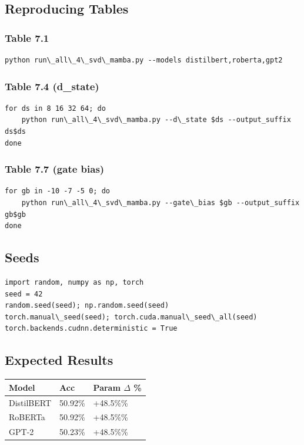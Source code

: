 \subsection{Reproducing Tables}

\subsubsection{Table 7.1}
\begin{lstlisting}
python run\_all\_4\_svd\_mamba.py --models distilbert,roberta,gpt2
\end{lstlisting}

\subsubsection{Table 7.4 (d\_state)}
\begin{lstlisting}
for ds in 8 16 32 64; do
    python run\_all\_4\_svd\_mamba.py --d\_state $ds --output_suffix ds$ds
done
\end{lstlisting}

\subsubsection{Table 7.7 (gate bias)}
\begin{lstlisting}
for gb in -10 -7 -5 0; do
    python run\_all\_4\_svd\_mamba.py --gate\_bias $gb --output_suffix gb$gb
done
\end{lstlisting}

\subsection{Seeds}

\begin{lstlisting}
import random, numpy as np, torch
seed = 42
random.seed(seed); np.random.seed(seed)
torch.manual\_seed(seed); torch.cuda.manual\_seed\_all(seed)
torch.backends.cudnn.deterministic = True
\end{lstlisting}

\subsection{Expected Results}

\begin{table}[H]
\centering
\small
\begin{tabular}{lll}
\toprule
\textbf{Model} & \textbf{Acc} & \textbf{Param $\Delta$ \%} \\
\midrule
DistilBERT & 50.92\% & +48.5\%\% \\
RoBERTa & 50.92\% & +48.5\%\% \\
GPT-2 & 50.23\% & +48.5\%\% \\
\bottomrule
\end{tabular}
\end{table}

